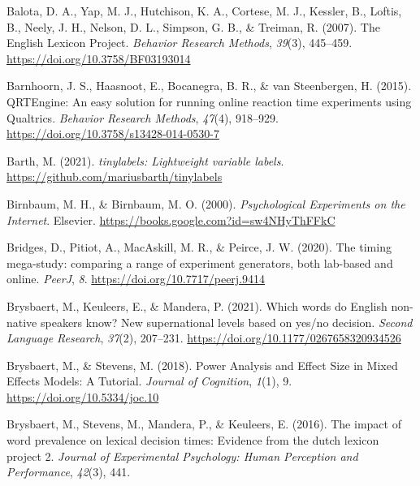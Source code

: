 \documentclass[
  english,
  man,floatsintext]{apa6}
\newlength{\cslhangindent}
\newlength{\cslentryspacingunit} %
\newenvironment{CSLReferences}[2] %
 {%
  \setlength{\parindent}{0pt}
  \ifodd #1
  \let\oldpar\par
  \def\par{\hangindent=\cslhangindent\oldpar}
  \fi
  \setlength{\parskip}{#2\cslentryspacingunit}
 }%
 {}
\begin{document}
\begin{CSLReferences}{1}{0}
\leavevmode{}%
Balota, D. A., Yap, M. J., Hutchison, K. A., Cortese, M. J., Kessler, B., Loftis, B., Neely, J. H., Nelson, D. L., Simpson, G. B., \& Treiman, R. (2007). The English Lexicon Project. \emph{Behavior Research Methods}, \emph{39}(3), 445--459. \url{https://doi.org/10.3758/BF03193014}

\leavevmode{}%
Barnhoorn, J. S., Haasnoot, E., Bocanegra, B. R., \& van Steenbergen, H. (2015). QRTEngine: An easy solution for running online reaction time experiments using Qualtrics. \emph{Behavior Research Methods}, \emph{47}(4), 918--929. \url{https://doi.org/10.3758/s13428-014-0530-7}

\leavevmode{}%
Barth, M. (2021). \emph{{tinylabels}: Lightweight variable labels}. \url{https://github.com/mariusbarth/tinylabels}

\leavevmode{}%
Birnbaum, M. H., \& Birnbaum, M. O. (2000). \emph{Psychological {Experiments} on the {Internet}}. {Elsevier}. \url{https://books.google.com?id=sw4NHyThFFkC}

\leavevmode{}%
Bridges, D., Pitiot, A., MacAskill, M. R., \& Peirce, J. W. (2020). The timing mega-study: comparing a range of experiment generators, both lab-based and online. \emph{PeerJ}, \emph{8}. \url{https://doi.org/10.7717/peerj.9414}

\leavevmode{}%
Brysbaert, M., Keuleers, E., \& Mandera, P. (2021). Which words do English non-native speakers know? New supernational levels based on yes/no decision. \emph{Second Language Research}, \emph{37}(2), 207--231. \url{https://doi.org/10.1177/0267658320934526}

\leavevmode{}%
Brysbaert, M., \& Stevens, M. (2018). Power Analysis and Effect Size in Mixed Effects Models: A Tutorial. \emph{Journal of Cognition}, \emph{1}(1), 9. \url{https://doi.org/10.5334/joc.10}

\leavevmode{}%
Brysbaert, M., Stevens, M., Mandera, P., \& Keuleers, E. (2016). The impact of word prevalence on lexical decision times: Evidence from the dutch lexicon project 2. \emph{Journal of Experimental Psychology: Human Perception and Performance}, \emph{42}(3), 441.


\end{CSLReferences}
\end{document}
